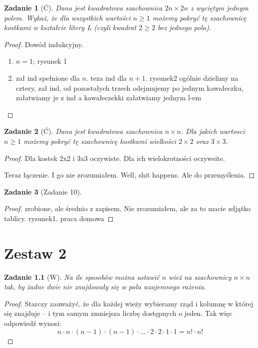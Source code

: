 \documentclass{mwbk}
\newtheorem{zad}{Zadanie}[chapter]
\begin{document}
\begin{zad}[Ć]
    Dana jest kwadratowa szachownica $2n \times 2n$ z wyciętym jednym polem.
    Wykaż, że dla wszystkich wartości $n \geq 1$ możemy pokryć tę szachownicę kostkami w
    kształcie litery L (czyli kwadrat $2 \geq 2$ bez jednego pola).
\end{zad}
\begin{proof}
    Dowód indukcyjny.
    \begin{enumerate}
        \item $n = 1$; rysunek 1
        \item zał ind spełnione dla $n$. teza ind dla $n+1$. rysunek2 ogólnie dzielimy na
              cztery, zał ind, od pozostałych trzech odejmujemy po jednym kawałeczku, załatwiamy
              je z ind a kawałeczekki załatwiamy jednym l-em
    \end{enumerate}
\end{proof}

\begin{zad}[Ć]
    Dana jest kwadratowa szachownica $n \times n$. Dla jakich wartosci $n\geq 1$
    możemy pokryć tę szachownicę kostkami wielkości $2 \times 2$ oraz $3 \times 3$.
\end{zad}
\begin{proof}
    Dla kostek 2x2 i 3x3 oczywiste. Dla ich wielokrotności oczywsite.

    Teraz łączenie. I go nie zrozumiałem. Well, shit happens.
    Ale do przemyślenia.
\end{proof}


\begin{zad}[Zadanie 10]

\end{zad}
\begin{proof}
    zrobione, ale średnio z zapisem.
    Nie zrozumiałem, ale za to macie zdjątko tablicy.
    rysunek1.
    praca domowa
\end{proof}



















\chapter{Zestaw 2}
\begin{zad}[W]
    Na ile sposobów można ustawić $n$ wież na szachownicy
    $n \times n$ tak, by żadne dwie nie znajdowały się w
    polu wzajemnego rażenia.
\end{zad}
\begin{proof}
    Starczy zauważyć, że dla każdej wieży wybieramy rząd i kolumnę
    w której się znajduje -- i tym samym zmniejsza liczbę dostępnych
    o jeden. Tak więc odpowiedź wynosi: \[n \cdot n \cdot (n-1) \cdot
        (n-1) \cdot ... \cdot 2 \cdot 2 \cdot 1 \cdot 1 =  n! \cdot n!\]
\end{proof}
\end{document}
